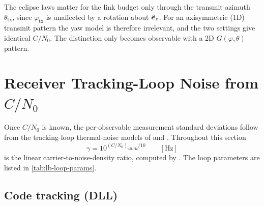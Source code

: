 \begin{lupntwarning}
The eclipse laws matter for the link budget only through the transmit azimuth
$\theta_\mathrm{tx}$, since $\varphi_\mathrm{tx}$ is unaffected by a rotation
about $\hat{\bm{e}}_z$.  For an axisymmetric (1D) transmit pattern the yaw model
is therefore irrelevant, and the two  settings give identical
$C/N_0$.  The distinction only becomes observable with a 2D
$G(\varphi,\theta)$ pattern.
\end{lupntwarning}

\section{Receiver Tracking-Loop Noise from $C/N_0$}
\label{sec:lb-tracking}

Once $C/N_0$ is known, the per-observable measurement standard deviations
follow from the tracking-loop thermal-noise models of \citet{kaplan2017} and
\citet{misra2011gnss}.  Throughout this section
\begin{equation}
  \gamma
  = 10^{\left(C/N_0\right)_{\mathrm{dB\text{-}Hz}}/10}
  \qquad [\si{\hertz}]
  \label{eq:lb-gamma}
\end{equation}
is the linear carrier-to-noise-density ratio, computed by
.  The loop parameters are listed in
\cref{tab:lb-loop-params}.

\subsection{Code tracking (DLL)}
\label{sec:lb-dll}

